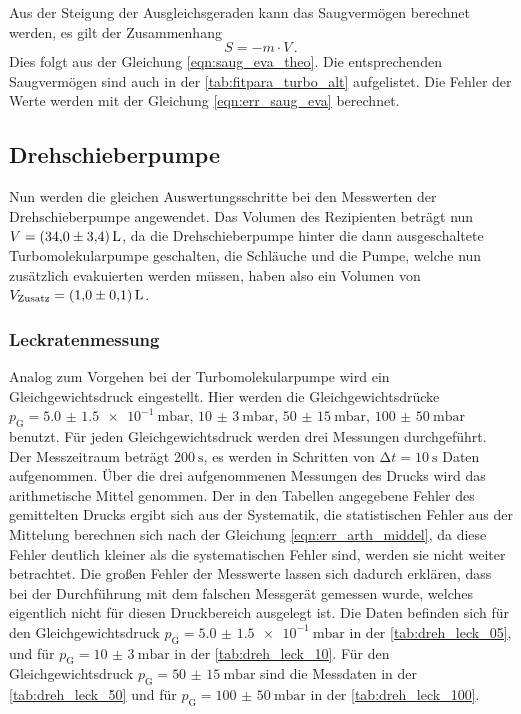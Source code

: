     \noindent Aus der Steigung der Ausgleichsgeraden kann das Saugvermögen berechnet werden, es gilt der Zusammenhang
    \begin{equation*}
      S = - m \cdot V\, .
    \end{equation*}
    Dies folgt aus der Gleichung \eqref{eqn:saug_eva_theo}. Die entsprechenden Saugvermögen sind auch in der \autoref{tab:fitpara_turbo_alt} aufgelistet. 
    Die Fehler der Werte werden mit der Gleichung \eqref{eqn:err_saug_eva} berechnet.

\subsection{Drehschieberpumpe}

    \noindent Nun werden die gleichen Auswertungsschritte bei den Messwerten der Drehschieberpumpe angewendet. Das Volumen des Rezipienten beträgt nun $V = \SI{34 \pm 3.4}{L}$, da die 
    Drehschieberpumpe hinter die dann ausgeschaltete Turbomolekularpumpe geschalten, die Schläuche und die Pumpe, welche nun zusätzlich evakuierten werden müssen, haben also ein Volumen von $V_\text{Zusatz} = \SI{1.0 \pm 0.1}{L}$. 

    \subsubsection{Leckratenmessung}

    \noindent Analog zum Vorgehen bei der Turbomolekularpumpe wird ein Gleichgewichtsdruck eingestellt. Hier werden die
    Gleichgewichtsdrücke $p_\text{G} = \SI{5.0(15)e-1}{\milli\bar}$, $\SI{10(3)}{\milli\bar}$, $\SI{50(15)}{\milli\bar}$, $\SI{100(50)}{\milli\bar}$ benutzt. Für jeden Gleichgewichtsdruck werden 
    drei Messungen durchgeführt. Der Messzeitraum beträgt $\SI{200}{\second}$, es werden in Schritten von $\increment t = \SI{10}{\second}$ Daten aufgenommen. Über die drei aufgenommenen
    Messungen des Drucks wird das arithmetische Mittel genommen. Der in den Tabellen angegebene Fehler des gemittelten Drucks ergibt sich aus der Systematik, die statistischen Fehler aus der 
    Mittelung berechnen sich nach der Gleichung \eqref{eqn:err_arth_middel}, da diese Fehler deutlich kleiner als die systematischen Fehler sind, werden sie nicht weiter betrachtet.
    Die großen Fehler der Messwerte lassen sich dadurch erklären, dass bei der Durchführung mit dem falschen Messgerät gemessen wurde, welches eigentlich nicht für diesen Druckbereich ausgelegt ist. 
    Die Daten befinden sich für den Gleichgewichtsdruck $p_\text{G} = \SI{5.0(15)e-1}{\milli\bar}$ in der \autoref{tab:dreh_leck_05}, und für $p_\text{G} = \SI{10(3)}{\milli\bar}$ in der 
    \autoref{tab:dreh_leck_10}. Für den Gleichgewichtsdruck $p_\text{G} = \SI{50(15)}{\milli\bar}$ sind die Messdaten in der \autoref{tab:dreh_leck_50} und für $p_\text{G} = \SI{100(50)}{\milli\bar}$
    in der \autoref{tab:dreh_leck_100}.

